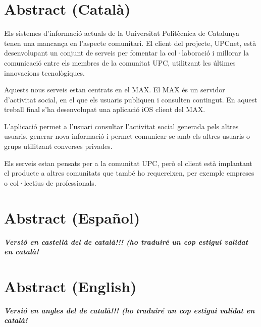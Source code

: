 \chapter{\Large \textbf{Abstract (Català)}\\}%
%


Els sistemes d'informació actuals de la  Universitat Politècnica de Catalunya tenen una mancança en l'aspecte comunitari. El client del projecte, UPCnet, està desenvolupant un conjunt de serveis per fomentar la col·laboració i millorar la comunicació entre els membres de la comunitat UPC, utilitzant les últimes innovacions tecnològiques.

Aquests nous serveis estan centrats en el MAX. El MAX és un servidor d'activitat social, en el que els usuaris publiquen i consulten contingut. En aquest treball final s'ha desenvolupat una aplicació iOS client del MAX. 

L'aplicació permet a l'usuari consultar l'activitat social generada pels altres usuaris, generar nova informació i permet comunicar-se amb els altres usuaris o grups utilitzant converses privades.

Els serveis estan pensats per a la comunitat UPC, però el client està implantant el producte a altres comunitats que també ho requereixen, per exemple empreses o col·lectius de professionals.

\newpage
{}
\chapter{\Large \textbf{Abstract (Español)}\\}%
%

\textit{\textbf{Versió en castellà del de català!!! (ho traduiré un cop estigui validat en català!}}

\newpage
{}
\chapter{\Large \textbf{Abstract (English)}\\}%
%

\textit{\textbf{Versió en angles del de català!!! (ho traduiré un cop estigui validat en català!}}